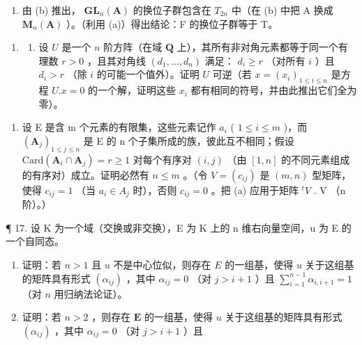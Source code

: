 \begin{enumerate}
\def\labelenumi{(\alph{enumi})}
\setcounter{enumi}{2}
\tightlist
\item
  由 (b) 推出， \(\mathbf{GL}_{n}(\mathbf{A})\) 的换位子群包含在 \(T_{2n}\) 中（在 (b) 中把 A 换成 \(\mathbf{M}_{n}(\mathbf{A})\) ）。（利用 (a)）得出结论：F 的换位子群等于 T。
\end{enumerate}

\begin{enumerate}
\def\labelenumi{\arabic{enumi}.}
\setcounter{enumi}{15}
\tightlist
\item
  \begin{enumerate}
  \def\labelenumii{(\alph{enumii})}
  \tightlist
  \item
    设 \(U\) 是一个 \(n\) 阶方阵（在域 \(\mathbf{Q}\) 上），其所有非对角元素都等于同一个有理数 \(r > 0\) ，且其对角线 \((d_1, \ldots, d_n)\) 满足： \(d_i \geqslant r\) （对所有 \(i\) ）且 \(d_i > r\) （除 \(i\) 的可能一个值外）。证明 \(U\) 可逆（若 \(x = (x_i)_{1 \leqslant i \leqslant n}\) 是方程 \(U.x = 0\) 的一个解，证明这些 \(x_i\) 都有相同的符号，并由此推出它们全为零）。
  \end{enumerate}
\end{enumerate}

\begin{enumerate}
\def\labelenumi{(\alph{enumi})}
\setcounter{enumi}{1}
\tightlist
\item
  设 E 是含 m 个元素的有限集，这些元素记作 \(a_{i}\) ( \(1 \leqslant i \leqslant m\) )，而 \((\mathbf{A}_{j})_{1 \leqslant j \leqslant n}\) 是 E 的 n 个子集所成的族，彼此互不相同；假设 \(\text{Card}(\mathbf{A}_{i} \cap \mathbf{A}_{j}) = r \geqslant 1\) 对每个有序对 \((i, j)\) （由 \([1, n]\) 的不同元素组成的有序对）成立。证明必然有 \(n \leqslant m\) 。（令 \(V = (c_{ij})\) 是 \((m, n)\) 型矩阵，使得 \(c_{ij} = 1\) （当 \(a_{i} \in A_{j}\) 时），否则 \(c_{ij} = 0\) 。把 (a) 应用于矩阵 \(^{t}V\) . V （n 阶）。）
\end{enumerate}

¶ 17. 设 K 为一个域（交换或非交换），E 为 K 上的 n 维右向量空间，u 为 E 的一个自同态。

\begin{enumerate}
\def\labelenumi{(\alph{enumi})}
\item
  证明：若 \(n > 1\) 且 \(u\) 不是中心位似，则存在 \(E\) 的一组基，使得 \(u\) 关于这组基的矩阵具有形式 \((\alpha_{ij})\) ，其中 \(\alpha_{ij} = 0\) （对 \(j > i + 1\) ）且 \(\sum_{i=1}^{n-1} \alpha_{i,i+1} = 1\) （对 \(n\) 用归纳法论证）。
\item
  证明：若 \(n > 2\) ，则存在 \(\mathbf{E}\) 的一组基，使得 \(u\) 关于这组基的矩阵具有形式 \((\alpha_{ij})\) ，其中 \(\alpha_{ij} = 0\) （对 \(j > i + 1\) ）且
\end{enumerate}

